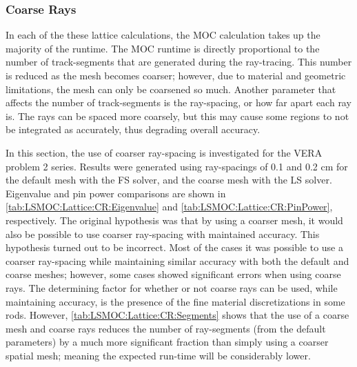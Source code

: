 {{{      \subsubsection{Coarse Rays}{\label{sssec:LSMOC:Coarse Rays}
        In each of the these lattice calculations, the \ac{MOC} calculation takes up the majority of the runtime.
        The \ac{MOC} runtime is directly proportional to the number of track-segments that are generated during the ray-tracing.
        This number is reduced as the mesh becomes coarser; however, due to material and geometric limitations, the mesh can only be coarsened so much.
        Another parameter that affects the number of track-segments is the ray-spacing, or how far apart each ray is.
        The rays can be spaced more coarsely, but this may cause some regions to not be integrated as accurately, thus degrading overall accuracy.

        In this section, the use of coarser ray-spacing is investigated for the \ac{VERA} problem 2 series.
        Results were generated using ray-spacings of 0.1 and 0.2 cm for the default mesh with the \ac{FS} solver, and the coarse mesh with the \ac{LS} solver.
        Eigenvalue and pin power comparisons are shown in \cref{tab:LSMOC:Lattice:CR:Eigenvalue} and \cref{tab:LSMOC:Lattice:CR:PinPower}, respectively.
        The original hypothesis was that by using a coarser mesh, it would also be possible to use coarser ray-spacing with maintained accuracy.
        This hypothesis turned out to be incorrect.
        Most of the cases it was possible to use a coarser ray-spacing while maintaining similar accuracy with both the default and coarse meshes; however, some cases showed significant errors when using coarse rays.
        The determining factor for whether or not coarse rays can be used, while maintaining accuracy, is the presence of the fine material discretizations in some rods.
        However, \cref{tab:LSMOC:Lattice:CR:Segments} shows that the use of a coarse mesh and coarse rays reduces the number of ray-segments (from the default parameters) by a much more significant fraction than simply using a coarser spatial mesh; meaning the expected run-time will be considerably lower.

}}}}
